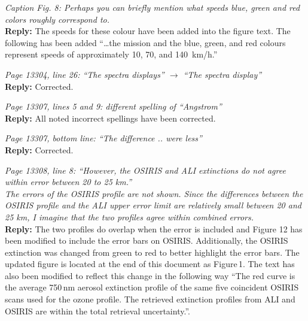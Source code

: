 \documentclass[12pt, notitlepage]{article}
\begin{document}
\textit{Caption Fig. 8: Perhaps you can briefly mention what speeds blue, green and red
colors roughly correspond to.}\\

\textbf{Reply:} The speeds for these colour have been added into the figure text. The following has been added ``\ldots the
  mission and the blue, green, and red colours represent speeds of approximately
  10, 70, and 140~km/h.''

\hrulefill

\textit{Page 13304, line 26: ``The spectra displays'' $\rightarrow$ ``The spectra display''}\\

\textbf{Reply:} Corrected.

\hrulefill

\textit{Page 13307, lines 5 and 9: different spelling of ``Angstrom''}\\

\textbf{Reply:} All noted incorrect spellings have been corrected.

\hrulefill

\textit{Page 13307, bottom line: ``The difference .. were less''}\\

\textbf{Reply:} Corrected.

\hrulefill

\textit{Page 13308, line 8: ``However, the OSIRIS and ALI extinctions do not agree within error
between 20 to 25 km.''}\\

\textit{The errors of the OSIRIS profile are not shown. Since the differences between the
OSIRIS profile and the ALI upper error limit are relatively small between 20 and 25 km,
I imagine that the two profiles agree within combined errors.}\\

\textbf{Reply:} The two profiles do overlap when the error is included and Figure 12 has
been modified to include the error bars on OSIRIS. Additionally, the OSIRIS extinction was changed from green to red to better highlight the error bars. The updated figure is located at the end of this document as Figure\,1.
The text has also been modified to reflect this change in the following way ``The red
curve is the average 750\,nm aerosol extinction profile of the
same five coincident OSIRIS scans used for the ozone profile. The
retrieved extinction profiles from ALI and OSIRIS are within the
total retrieval uncertainty.''.

\hrulefill
\end{document}
